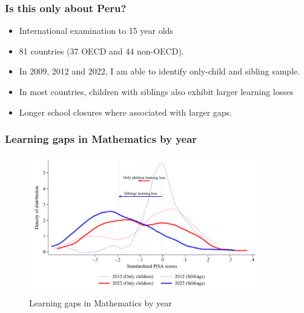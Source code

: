 \documentclass{beamer}
\begin{document}
    \begin{frame}
            \label{frame:pisadata}
            \frametitle{Is this only about Peru?}
        \begin{itemize}
            \item International examination to 15 year olds
            \item 81 countries (37 OECD and 44 non-OECD).
            \item In 2009, 2012 and 2022, I am able to identify only-child and sibling sample.
            \item In most countries, children with siblings also exhibit larger learning losses
            \item Longer school closures where associated with larger gaps.
        \end{itemize}
    \end{frame}

\begin{frame}
    \label{frame:pisagaps}
    \frametitle{Learning gaps in Mathematics by year}
    
    \begin{figure}
        \centering
        \includegraphics[width=0.9\textwidth]{./FIGURES/Descriptive/PISA_distribution_2012_2022_PV4MATH.pdf}
        \caption{Learning gaps in Mathematics by year}
        \label{fig:1a}
    \end{figure}
    
\end{frame}
\end{document}
